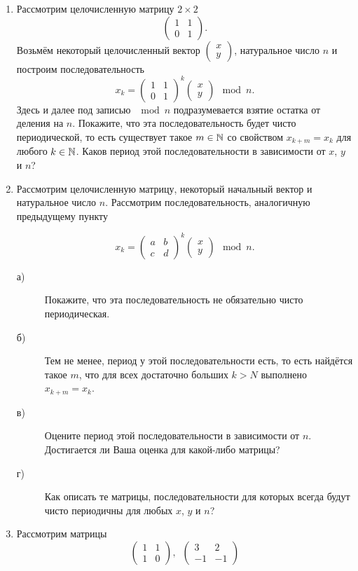 \begin{enumerate}
\item Рассмотрим целочисленную матрицу $2\times 2$ 
$$\left(\begin{matrix}
1 & 1 \\
0 & 1 
\end{matrix}\right).$$
Возьмём некоторый целочисленный вектор $\left(\begin{smallmatrix} x  \\ y \end{smallmatrix}\right)$, натуральное число $n$ и построим последовательность
$$x_k=\left(\begin{matrix}
1 & 1 \\
0 & 1 
\end{matrix}\right)^k \left(\begin{matrix} x \\ y \end{matrix}\right) \mod n.$$
Здесь и далее под записью $\mod n$ подразумевается взятие остатка от деления на $n$.
Покажите, что эта последовательность будет чисто периодической, то есть существует такое $m\in \mathbb{N}$ со свойством $x_{k+m}=x_k$ для любого $k\in\mathbb{N}$. Каков период этой последовательности в зависимости от $x$, $y$ и $n$?
\item Рассмотрим целочисленную матрицу, некоторый начальный вектор и натуральное число $n$. Рассмотрим последовательность, аналогичную предыдущему пункту

$$x_k=\left(\begin{matrix}
a & b \\
c & d
\end{matrix}\right)^k\left(\begin{matrix} x \\ y \end{matrix}\right) \mod n.$$
\begin{description}
\item[а)] Покажите, что эта последовательность не обязательно чисто периодическая.
\item[б)] Тем не менее, период у этой последовательности есть, то есть найдётся такое $m$, что для всех достаточно больших $k>N$ выполнено $x_{k+m}=x_k$. 
\item[в)] Оцените период этой последовательности в зависимости от $n$. Достигается ли Ваша оценка для какой-либо матрицы?
\item[г)] Как описать те матрицы, последовательности для которых всегда будут чисто периодичны для любых $x$, $y$ и $n$?
\end{description}
\item Рассмотрим матрицы 
$$\left(\begin{matrix}
1 & 1 \\
1 & 0
\end{matrix}\right), \,\,\,\left(\begin{matrix}
3 & 2 \\
-1 & -1
\end{matrix}\right)
$$


\end{enumerate}
